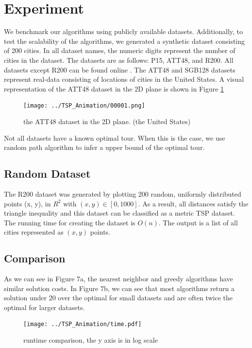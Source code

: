 \documentclass[10pt,twocolumn,letterpaper]{article}
\begin{document}
\section{Experiment}
We benchmark our algorithms using publicly available
datasets. 
Additionally, to test the scalability of the algorithms, we generated a synthetic dataset consisting of 200 cities. 
In all dataset names, the numeric digits represent
the number of cities in the dataset. 
The datasets are as follows: P15, ATT48, and R200.
All datasets except R200 can be found online \cite{data0}\cite{data1}. The
ATT48 and SGB128 datasets represent real-data consisting
of locations of cities in the United States. 
A visual representation of the ATT48 dataset in the 2D plane is shown
in Figure \ref{fig:00001}
\begin{figure}
\centering
\texttt{[image: ../TSP\_Animation/00001.png]}
\caption{the ATT48 dataset in the 2D plane. (the United States)}
\label{fig:00001}
\end{figure}

Not all datasets have a known optimal tour. When this is the case, we use random path algorithm to infer a upper bound of the optimal tour. 

\subsection{Random Dataset}
The R200 dataset was generated by plotting 200 random, 
uniformly distributed points (x, y), in $R^2$ with $(x, y) \in
[0, 1000]$. As a result, all
distances satisfy the triangle inequality and this dataset can
be classified as a metric TSP dataset. The running time
for creating the dataset is $O(n)$. 
The output is a list of all cities represented as $(x,y)$ points.

\subsection{Comparison}
As we can see in Figure 7a, the nearest neighbor and
greedy algorithms have similar solution costs. In Figure 7b,
we can see that most algorithms return a solution under 20%
over the optimal for small datasets and are often twice the
optimal for larger datasets.
\begin{figure}
\centering
\texttt{[image: ../TSP\_Animation/time.pdf]}
\caption{runtime comparison, the y axis is in log scale}
\label{fig:tsp}
\end{figure}
\end{document}
